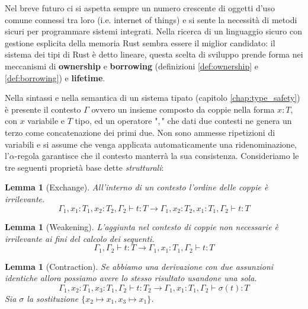 \documentclass[Lau,binding=0.6cm]{sapthesis}
\newtheorem{lemma}[theorem]{Lemma}
\begin{document}
Nel breve futuro ci si aspetta sempre un numero crescente di oggetti d'uso comune connessi tra loro (i.e. internet of things) e si sente la necessità di metodi sicuri per programmare sistemi integrati. 
Nella ricerca di un linguaggio sicuro con gestione esplicita della memoria Rust sembra essere il miglior candidato: il sistema dei tipi di Rust è detto lineare, questa scelta di sviluppo prende forma nei meccanismi di \textbf{ownership} e \textbf{borrowing} (definizioni \ref{def:ownership} e \ref{def:borrowing}) e \textbf{lifetime}. 

Nella sintassi e nella semantica di un sistema tipato (capitolo \ref{chap:type_safety}) è presente il contesto $\Gamma$ ovvero un insieme composto da coppie nella forma $x:T$, con $x$ variabile e $T$ tipo, ed un operatore "$,$" che dati due contesti ne genera un terzo come concatenazione dei primi due. 
Non sono ammesse ripetizioni di variabili e si assume che venga applicata automaticamente una ridenominazione, l'$\alpha$-regola garantisce che il contesto manterrà la sua consistenza. Consideriamo le tre seguenti proprietà base dette \textit{strutturali}:

\begin{lemma}[Exchange] \label{lemma:exchange}
  All'interno di un contesto l'ordine delle coppie è irrilevante.
  \begin{equation*}
      \Gamma_{1},x_{1}:T_{1},x_{2}:T_{2},\Gamma_{2} \vdash t:T \longrightarrow \Gamma_{1},x_{2}:T_{2},x_{1}:T_{1},\Gamma_{2} \vdash t:T
  \end{equation*}
\end{lemma}

\begin{lemma}[Weakening] \label{lemma:weakening}
  L'aggiunta nel contesto di coppie non necessarie è irrilevante ai fini del calcolo dei sequenti.
  \begin{equation*}
      \Gamma_{1},\Gamma_{2} \vdash t:T \longrightarrow \Gamma_{1},x_{1}:T_{1},\Gamma_{2} \vdash t:T
  \end{equation*}
\end{lemma}

\begin{lemma}[Contraction] \label{lemma:contraction}
  Se abbiamo una derivazione con due assunzioni identiche allora possiamo avere lo stesso risultato usandone una sola.
  \begin{equation*}
      \Gamma_{1},x_{2}:T_{1},x_{3}:T_{1},\Gamma_{2} \vdash t:T_{2} \longrightarrow \Gamma_{1},x_{1}:T_{1},\Gamma_{2} \vdash \sigma(t):T
  \end{equation*}
  Sia $\sigma$ la sostituzione $\{ x_{2} \mapsto x_{1}, x_{3} \mapsto x_{1} \}$.
\end{lemma}
\end{document}
